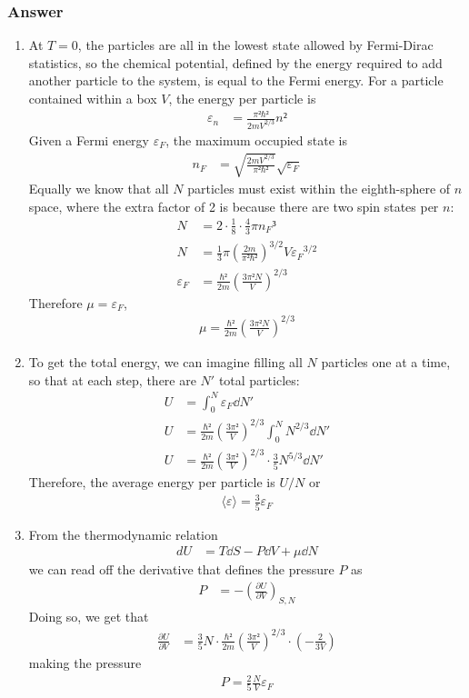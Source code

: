 \subsubsection{Answer}
\begin{enumerate}
	\item
		At $T = 0$, the particles are all in the lowest state allowed by
		Fermi-Dirac statistics, so the chemical potential, defined by the
		energy required to add another particle to the system, is equal to the
		Fermi energy. For a particle contained within a box $V$, the energy
		per particle is
		\begin{align*}
			ε_n &= \frac{π²ℏ²}{2mV^{2/3}} n²
		\end{align*}
		Given a Fermi energy $ε_F$, the maximum occupied state is
		\begin{align*}
			n_F &= \sqrt{\frac{2mV^{2/3}}{π²ℏ²}} \sqrt{ε_F}
		\end{align*}
		Equally we know that all $N$ particles must exist within the
		eighth-sphere of $n$ space, where the extra factor of 2 is because
		there are two spin states per $n$:
		\begin{align*}
			N &= 2·\frac 18 · \frac 43 π{n_F}³ \\
			N &= \frac 13 π ( \frac{2m}{π²ℏ²} )^{3/2} V {ε_F}^{3/2} \\
			ε_F &= \frac{ℏ²}{2m} (\frac{3π²N}{V})^{2/3}
		\end{align*}
		Therefore $μ = ε_F$,
		\begin{align}
			\boxed{
			μ = \frac{ℏ²}{2m} (\frac{3π²N}{V})^{2/3}
			}
		\end{align}
	\item
		To get the total energy, we can imagine filling all $N$ particles one
		at a time, so that at each step, there are $N'$ total particles:
		\begin{align*}
			U &= ∫_0^N ε_F \dd N' \\
			U &= \frac{ℏ²}{2m} (\frac{3π²}{V})^{2/3} ∫_0^N N^{2/3} \dd N' \\
			U &= \frac{ℏ²}{2m} (\frac{3π²}{V})^{2/3} · \frac 35 N^{5/3} \dd N'
		\end{align*}
		Therefore, the average energy per particle is $U/N$ or
		\begin{align}
			\boxed{
			\langle ε \rangle = \frac 35 ε_F
			}
		\end{align}
	\item
		From the thermodynamic relation
		\begin{align*}
			dU &= T\dd S - P\dd V + μ\dd N
		\end{align*}
		we can read off the derivative that defines the pressure $P$ as
		\begin{align*}
			P &= - ( \frac{∂U}{∂V} )_{S,N}
		\end{align*}
		Doing so, we get that
		\begin{align*}
			\frac{∂U}{∂V} &= \frac 35 N · \frac{ℏ²}{2m} (\frac{3π²}{V})^{2/3} ·
				(-\frac{2}{3V})
		\end{align*}
		making the pressure
		\begin{align}
			\boxed{
			P = \frac 25 \frac{N}{V} ε_F
			}
		\end{align}
\end{enumerate}

